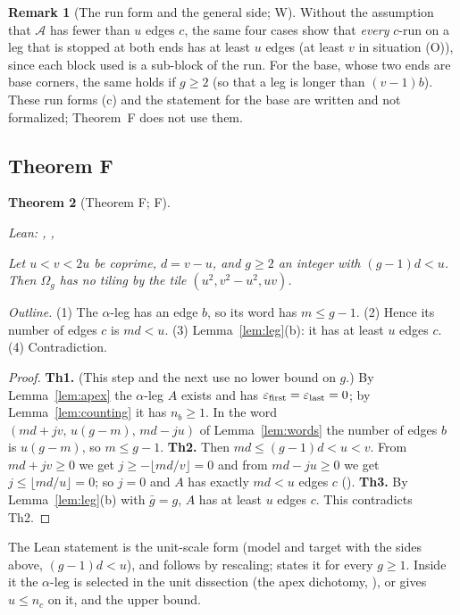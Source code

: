 \documentclass[11pt,reqno]{amsart}
\theoremstyle{plain}
\newtheorem{theorem}{Theorem}[section]
\theoremstyle{definition}
\newtheorem{remark}[theorem]{Remark}
\newcommand{\sF}{\textup{\textsf{F}}}
\newcommand{\sW}{\textup{\textsf{W}}}
\begin{document}
\begin{remark}[The run form and the general side; \sW]\label{rem:anyside}
Without the assumption that $\mathcal A$ has fewer than $u$ edges $c$, the same four cases show that \emph{every} $c$-run on a leg that is stopped at both ends has at least $u$ edges (at least $v$ in situation (O)), since each block used is a sub-block of the run. For the base, whose two ends are base corners, the same holds if $g\ge2$ (so that a leg is longer than $(v-1)b$). These run forms (c) and the statement for the base are written and not formalized; Theorem~F does not use them.
\end{remark}

\subsection{Theorem F}\label{sub:outline}
\begin{theorem}[Theorem F; \sF]\label{thm:Dprime}
{\small\noindent\emph{Lean:} , , \par}
Let $u<v<2u$ be coprime, $d=v-u$, and $g\ge2$ an integer with $(g-1)d<u$. Then $\Omega_{g}$ has no tiling by the tile $(u^2,v^2-u^2,uv)$.
\end{theorem}
\emph{Outline.} (1) The $\alpha$-leg has an edge $b$, so its word has $m\le g-1$. (2) Hence its number of edges $c$ is $md<u$. (3) Lemma~\ref{lem:leg}(b): it has at least $u$ edges $c$. (4) Contradiction.
\begin{proof}
\textbf{Th1.} (This step and the next use no lower bound on $g$.) By Lemma~\ref{lem:apex} the $\alpha$-leg $A$ exists and has $\varepsilon_{\rm first}=\varepsilon_{\rm last}=0$; by Lemma~\ref{lem:counting} it has $n_b\ge1$. In the word $(md+jv,\,u(g-m),\,md-ju)$ of Lemma~\ref{lem:words} the number of edges $b$ is $u(g-m)$, so $m\le g-1$.
\textbf{Th2.} Then $md\le(g-1)d<u<v$. From $md+jv\ge0$ we get $j\ge-\lfloor md/v\rfloor=0$ and from $md-ju\ge0$ we get $j\le\lfloor md/u\rfloor=0$; so $j=0$ and $A$ has exactly $md<u$ edges $c$ ().
\textbf{Th3.} By Lemma~\ref{lem:leg}(b) with $\bar g=g$, $A$ has at least $u$ edges $c$. This contradicts Th2.
\end{proof}
The Lean statement is the unit-scale form  (model and target with the sides above, $(g-1)d<u$), and  follows by rescaling;  states it for every $g\ge1$. Inside it the $\alpha$-leg is selected in the unit dissection (the apex dichotomy, ),  or  gives $u\le n_c$ on it, and  the upper bound.
\end{document}
